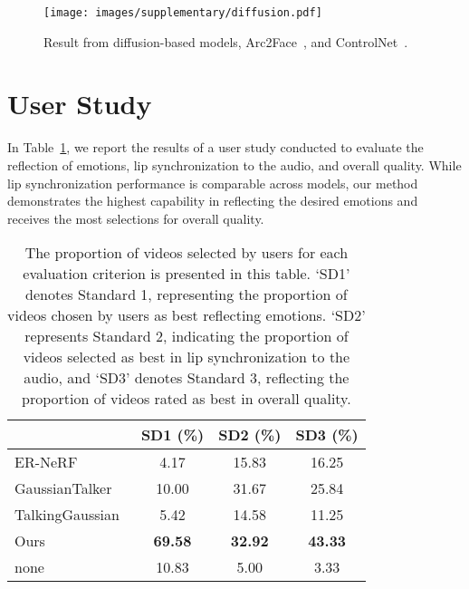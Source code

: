 \begin{figure}[t]
    \centering
    \texttt{[image: images/supplementary/diffusion.pdf]}
    \caption{Result from diffusion-based models, Arc2Face~\cite{paraperas2024arc2face}, and ControlNet~\cite{zhang2023adding}.}
    \label{fig:diffusion}
\end{figure}

\section{User Study}
In Table~\ref{tab:user study}, we report the results of a user study conducted to evaluate the reflection of emotions, lip synchronization to the audio, and overall quality. While lip synchronization performance is comparable across models, our method demonstrates the highest capability in reflecting the desired emotions and receives the most selections for overall quality.

\begin{table}[h]
    \centering
    \begin{tabular}{l|ccc}
        \hline
          & SD1 (\%) & SD2 (\%) & SD3 (\%) \\
         \hline
         ER-NeRF~\cite{li2023efficient} & 4.17 & 15.83 & 16.25 \\
         GaussianTalker~\cite{cho2024gaussiantalker} & 10.00 & 31.67 & 25.84 \\
         TalkingGaussian~\cite{li2024talkinggaussian} & 5.42 & 14.58 & 11.25 \\
         Ours & \textbf{69.58} & \textbf{32.92} & \textbf{43.33} \\
         none & 10.83 & 5.00 & 3.33 \\
         \hline
    \end{tabular}
    \caption{The proportion of videos selected by users for each evaluation criterion is presented in this table. `SD1' denotes Standard 1, representing the proportion of videos chosen by users as best reflecting emotions. `SD2' represents Standard 2, indicating the proportion of videos selected as best in lip synchronization to the audio, and `SD3' denotes Standard 3, reflecting the proportion of videos rated as best in overall quality.}
    \label{tab:user study}
\end{table}

